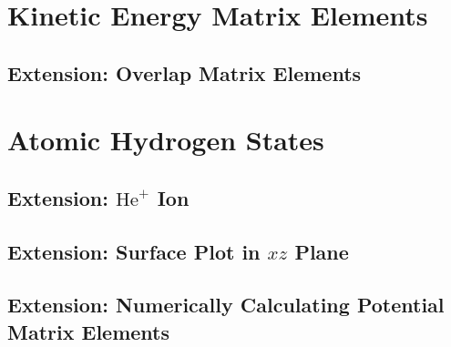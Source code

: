 \documentclass[]{article}
\begin{document}

\section{Kinetic Energy Matrix Elements}
\label{sec:kinet-energy-matr}


\subsection{Extension: Overlap Matrix Elements}
\label{sec:extens-overl-matr}


\section{Atomic Hydrogen States}
\label{sec:atom-hydr-stat}




\subsection{Extension: $\mathrm{He}^{+}$ Ion}
\label{sec:extens-he+-ion}


\subsection{Extension: Surface Plot in $xz$ Plane}
\label{sec:extens-surface-plot-xz}


\subsection{Extension: Numerically Calculating Potential Matrix Elements}
\label{sec:extens-numer-calc-potent}

\end{document}
